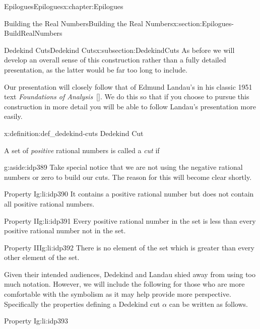 \begin{chapterptx}{Epilogues}{}{Epilogues}{}{}{x:chapter:Epilogues}
\begin{sectionptx}{Building the Real Numbers}{}{Building the Real Numbers}{}{}{x:section:Epilogues-BuildRealNumbers}
\begin{subsectionptx}{Dedekind Cuts}{}{Dedekind Cuts}{}{}{x:subsection:DedekindCuts}
			As before we will develop an overall sense of this construction rather than a fully detailed presentation, as the latter would be far too long to include.%
			\par
			Our presentation will closely follow that of Edmund Landau's in his classic 1951 text \emph{Foundations of Analysis}~\hyperlink{x:biblio:landau66__found_analy}{[{}]}. We do this so that if you choose to pursue this construction in more detail you will be able to follow Landau's presentation more easily.%
			\begin{definition}{}{x:definition:def_dedekind-cuts}%
				\alert{Dedekind Cut}%
				\par
				 A set of \emph{positive} rational numbers is called a \emph{cut} if%
				\begin{aside}{}{g:aside:idp389}%
					Take special notice that we are not using the negative rational numbers or zero to build our cuts.  The reason for this will become clear shortly.%
				\end{aside}
				\begin{descriptionlist}
					\begin{dlimedium}{Property I}{g:li:idp390}%
						It contains a positive rational number but does not contain all positive rational numbers.%
					\end{dlimedium}%
					\begin{dlimedium}{Property II}{g:li:idp391}%
						Every positive rational number in the set is less than every positive rational number not in the set.%
					\end{dlimedium}%
					\begin{dlimedium}{Property III}{g:li:idp392}%
						There is no element of the set which is greater than every other element of the set.%
					\end{dlimedium}%
				\end{descriptionlist}
			\end{definition}
			Given their intended audiences, Dedekind  and Landau shied away from using too much notation. However, we will include the following for those who are more comfortable with the symbolism as it may help provide more perspective. Specifically the properties defining a Dedekind cut \(\alpha\) can be written as follows.%
			\par
			\begin{descriptionlist}
				\begin{dlimedium}{Property I}{g:li:idp393}%

\end{dlimedium}
\end{descriptionlist}
\end{subsectionptx}
\end{sectionptx}
\end{chapterptx}
